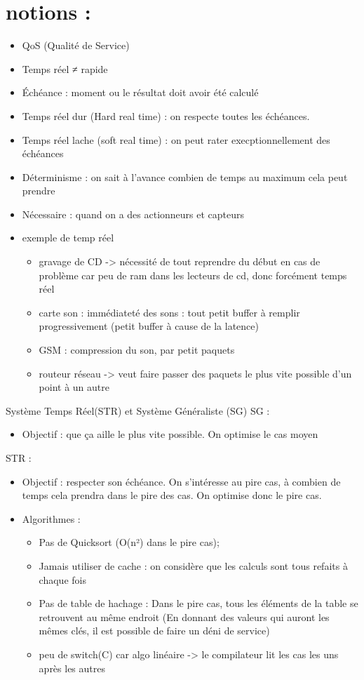 \documentclass{article}
\begin{document}
\section{notions :}
	\begin{itemize}
	\item QoS (Qualité de Service)
	\item Temps réel ≠ rapide
	\item Échéance : moment ou le résultat doit avoir été calculé
	\item Temps réel dur (Hard real time) : on respecte toutes les échéances.
	\item Temps réel lache (soft real time) : on peut rater execptionnellement des échéances
	\item Déterminisme : on sait à l'avance combien de temps au maximum cela peut prendre
	\item Nécessaire : quand on a des actionneurs et capteurs
	\item exemple de temp réel
	\begin{itemize}: 
		\item gravage de CD -> nécessité de tout reprendre du début en cas de problème car peu de ram dans les lecteurs de cd, donc forcément temps réel
		\item carte son : immédiateté des sons : tout petit buffer à remplir progressivement (petit buffer à cause de la latence)
		\item GSM : compression du son, par petit paquets
		\item routeur réseau -> veut faire passer des paquets le plus vite possible d'un point à un autre
	\end{itemize}
\end{itemize}

Système Temps Réel(STR) et Système Généraliste (SG)
SG : 
\begin{itemize}
	\item Objectif : que ça aille le plus vite possible. On optimise le cas moyen
\end{itemize}
STR :
\begin{itemize}
	\item Objectif : respecter son échéance. On s'intéresse au pire cas, à combien de temps cela prendra dans le pire des cas. On optimise donc le pire cas.
	\item Algorithmes : 
	\begin{itemize}
		\item Pas de Quicksort (O(n²) dans le pire cas); 
		\item Jamais utiliser de cache : on considère que les calculs sont tous refaits à chaque fois
		\item Pas de table de hachage : Dans le pire cas, tous les éléments de la table se retrouvent au même endroit (En donnant des valeurs qui auront les mêmes clés, il est possible de faire un déni de service)
		\item peu de switch(C) car algo linéaire -> le compilateur lit les cas les uns après les autres
	\end{itemize}
\end{itemize}
\end{document}
